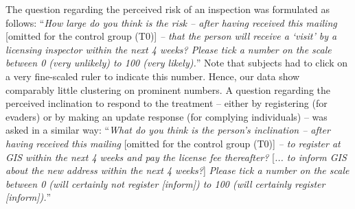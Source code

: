 \documentclass[prod,jeeabib]{jeea}
\begin{document}
The question regarding the perceived risk of an inspection was formulated as follows: \normalsize{``\textit{How large do you think is the risk -- after having received this mailing} [omitted for the control group (T0)] \textit{-- that the person will receive a `visit' by a licensing inspector within the next 4 weeks? Please tick a number on the scale between 0 (very unlikely) to 100 (very likely).}''} Note that subjects had to click on a very fine-scaled ruler to indicate this number. Hence, our data show comparably little clustering on prominent numbers.
%
\normalsize{A question regarding the perceived inclination to respond to the treatment -- either by registering (for evaders) or by making an update response (for complying individuals) -- was asked in a similar way:} \normalsize{``\textit{What do you think is the person's inclination -- after having received this mailing} [omitted for the control group (T0)] \textit{-- to register at GIS within the next 4 weeks and pay the license fee thereafter?} [\textit{... to inform GIS about the new address within the next 4 weeks?}] \textit{Please tick a number on the scale between 0 (will certainly not register [inform]) to 100 (will certainly register [inform]).}''}\smallskip \\
%
\end{document}
